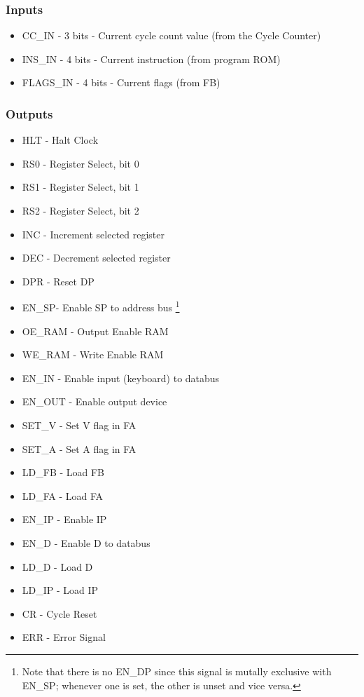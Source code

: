 \subsubsection*{Inputs}
\begin{itemize}
\itemsep0em
\item CC\_IN - 3 bits - Current cycle count value (from the Cycle Counter)
\item INS\_IN - 4 bits - Current instruction (from program ROM)
\item FLAGS\_IN - 4 bits - Current flags (from FB)
\end{itemize}

\subsubsection*{Outputs}
\begin{itemize}
\itemsep0em 
\item HLT - Halt Clock
\item RS0 - Register Select, bit 0
\item RS1 - Register Select, bit 1
\item RS2 - Register Select, bit 2
\item INC - Increment selected register
\item DEC - Decrement selected register
\item DPR - Reset DP
\item EN\_SP- Enable SP to address bus \footnote{Note that there is no EN\_DP since this signal is mutally exclusive with EN\_SP; whenever one is set, the other is unset and vice versa.}
\item OE\_RAM - Output Enable RAM
\item WE\_RAM - Write Enable RAM
\item EN\_IN - Enable input (keyboard) to databus
\item EN\_OUT - Enable output device
\item SET\_V - Set V flag in FA
\item SET\_A - Set A flag in FA
\item LD\_FB - Load FB
\item LD\_FA - Load FA
\item EN\_IP - Enable IP
\item EN\_D - Enable D to databus
\item LD\_D - Load D
\item LD\_IP - Load IP
\item CR - Cycle Reset
\item ERR - Error Signal
\end{itemize}


